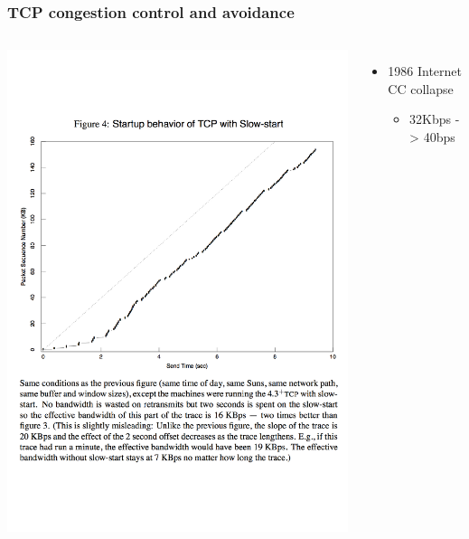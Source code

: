 \begin{frame}
  \frametitle{TCP congestion control and avoidance}

  \begin{columns}[T]
      \begin{center}
	\includegraphics[width=1.2\textwidth]{../../figures/vj-congestion-slow-start.pdf}
      \end{center}


      \begin{itemize}
	\item 1986 Internet CC collapse
	\begin{itemize}
	  \item 32Kbps -> 40bps
	\end{itemize}

	\pause


\end{itemize}
\end{columns}
\end{frame}
